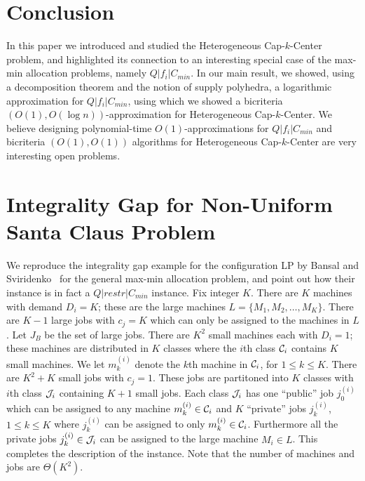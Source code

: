 \documentclass{llncs}
\def\mckc{{{\sffamily Heterogeneous Cap-$k$-Center}}\xspace}
\def\cckp{$Q|f_i|C_{min}$\xspace}
\begin{document}
\section{Conclusion}
In this paper we introduced and studied the \mckc problem, and highlighted its connection to an interesting special case of the max-min allocation problems, namely \cckp. In our main result, we showed, using a decomposition theorem and the notion of supply polyhedra, a logarithmic approximation for \cckp, using which we showed a bicriteria $(O(1),O(\log n))$-approximation for \mckc. We believe designing polynomial-time $O(1)$-approximations for \cckp and bicriteria $(O(1),O(1))$ algorithms for \mckc are very interesting open problems.



\newpage
\appendix



%











\section{Integrality Gap for Non-Uniform Santa Claus Problem}\label{sec:app-bsig}
We reproduce the integrality gap example for the configuration LP by Bansal and Sviridenko~\cite{BansalS06} for the general max-min allocation problem, and point out how their instance is in fact a $Q|restr|C_{min}$ instance.
Fix integer $K$. There are $K$ machines with demand $D_i = K$; these are the large machines $L = \{M_1,M_2,\ldots,M_K\}$. There are $K-1$ large jobs with $c_j = K$ which can only be assigned to the machines in $L$.
Let $J_B$ be the set of large jobs. There are $K^2$ small machines each with $D_i = 1$; these machines are distributed in $K$ classes where the $i$th class ${\cal C}_i$ contains $K$ small machines. We let $m^{(i)}_k$ denote the $k$th machine in ${\cal C}_i$, for $1\leq k\leq K$.
There are $K^2 + K$ small jobs with $c_j = 1$. These jobs are partitoned into $K$ classes with $i$th class ${\cal J}_i$ containing $K+1$ small jobs. Each class ${\cal J}_i$ has one ``public'' job $j^{(i)}_0$ which can be assigned to any machine $m^{(i)}_k \in {\cal C}_i$
 and $K$ ``private'' jobs $j^{(i)}_k$, $1\leq k\leq K$ where $j^{(i)}_k$ can be assigned to only $m^{(i)}_k \in {\cal C}_i$. Furthermore all the private jobs $j^{(i)}_k\in {\cal J}_i$ can be assigned to the large machine $M_i \in L$. This completes the description of the instance.
Note that the number of machines and jobs are $\Theta(K^2)$.
\end{document}
